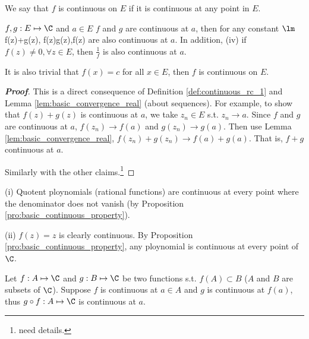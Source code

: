 \begin{definition}\label{def:continuous_rc_on_set}
We say that $f$ is continuous on $E$ if it is continuous at any point in $E$.
\end{definition}


\begin{proposition}\label{pro:basic_continuous_property}
$f,g:E\mapsto \C$ and $a\in E$ $f$ and $g$ are continuous at $a$, then for any constant $\lm$
\be
{}f(z)+g(z),\qquad {} f(z)g(z),\qquad {}\lm f(z)
\ee
are also continuous at $a$. In addition, (iv) if $f(z)\neq 0,\forall z\in E$, then $\frac 1f$ is also continuous at $a$.
\end{proposition}

\begin{remark}
It is also trivial that $f(x) = c$ for all $x\in E$, then $f$ is continuous on $E$.
\end{remark}

\begin{proof}[{\bf Proof}]
This is a direct consequence of Definition \ref{def:continuous_rc_1} and Lemma \ref{lem:basic_convergence_real} (about sequences). For example, to show that $f(z)+g(z)$ is continuous at $a$, we take $z_n\in E$ s.t. $z_n\to a$. Since $f$ and $g$ are continuous at $a$, $f(z_n)\to f(a)$ and $g(z_n)\to g(a)$. Then use Lemma \ref{lem:basic_convergence_real}, $f(z_n)+g(z_n)\to f(a) + g(a)$. That is, $f+g$ continuous at $a$. 

Similarly with the other claims.\footnote{need details.}
\end{proof}

\begin{example}
\ben
\item [(i)] Quotent ploynomials (rational functions) are continuous at every point where the denominator does not vanish (by Proposition \ref{pro:basic_continuous_property}).
\item [(ii)] $f(z)=z$ is clearly continuous. By Proposition \ref{pro:basic_continuous_property}, any ploynomial is continuous at every point of $\C$.
\een
\end{example}

\begin{theorem}\label{thm:composition_of_continuous_functions}
Let $f:A\mapsto \C$ and $g:B\mapsto \C$ be two functions s.t. $f(A)\subset B$ ($A$ and $B$ are subsets of $\C$). Suppose $f$ is continuous at $a\in A$ and $g$ is continuous at $f(a)$, thus $g\circ f:A\mapsto \C$ is continuous at $a$.
\end{theorem}


